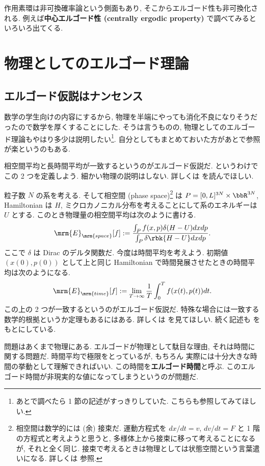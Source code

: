 \documentclass[openany, a4paper, oneside]{jsbook}
\begin{document}
作用素環は非可換確率論という側面もあり, そこからエルゴード性も非可換化される.
例えば\textbf{中心エルゴード性 (centrally ergodic property)} で調べてみるといろいろ出てくる.
\section{物理としてのエルゴード理論}

\subsection{エルゴード仮説はナンセンス}

数学の学生向けの内容にするから,
物理を半端にやっても消化不良になりそうだったので数学を厚くすることにした.
そうは言うものの, 物理としてのエルゴード理論もやはり多少は説明したい\footnote{あとで調べたら \cite{AyumuSugita1} 1 節の記述がすっきりしていた.
こちらも参照してみてほしい.}.
自分としてもまとめておいた方があとで参照が楽というのもある.

相空間平均と長時間平均が一致するというのがエルゴード仮説だ.
というわけでこの 2 つを定義しよう.
細かい物理の説明はしない.
詳しくは \cite{NakamuraYamamoto1, NakamuraYamamoto2} を読んでほしい.

粒子数 $N$ の系を考える.
そして相空間 (phase space)\footnote{相空間は数学的には (余) 接束だ.
運動方程式を $dx / dt = v$, $dv / dt = F$ と 1 階の方程式と考えようと思うと,
多様体上から接束に移って考えることになるが, それと全く同じ.
接束で考えるときは物理としては状態空間という言葉遣いになる.
詳しくは \cite{NakamuraYamamoto1} 参照.} は $P = [0, L]^{3N} \times \bbR^{3N}$,
Hamiltonian は $H$, ミクロカノニカル分布を考えることにして系のエネルギーは $U$ とする.
このとき物理量の相空間平均は次のように書ける.
\begin{align}
 \mrm{E}_{\mrm{space}} [f]
 :=
 \frac{\int_{P} f(x, p) \delta (H - U) dx dp} {\int_{P} \delta \rbk{H - U} dx dp}.
\end{align}
ここで $\delta$ は Dirac のデルタ関数だ.
今度は時間平均を考えよう.
初期値 $(x(0), p(0))$ として上と同じ Hamiltonian で時間発展させたときの時間平均は次のようになる.
\begin{align}
 \mrm{E}_{\mrm{time}} [f]
 :=
 \lim_{T \to \infty} \frac{1}{T} \int_0^T f(x(t), p(t)) dt.
\end{align}
この上の 2 つが一致するというのがエルゴード仮説だ.
特殊な場合には一致する数学的根拠というか定理もあるにはある.
詳しくは \cite{HalTasaki3} を見てほしい.
続く記述も \cite{HalTasaki3} をもとにしている.

問題はあくまで物理にある.
エルゴードが物理として駄目な理由,
それは時間に関する問題だ.
時間平均で極限をとっているが, もちろん
実際には十分大きな時間の挙動として理解できればいい.
この時間を\textbf{エルゴード時間}と呼ぶ.
このエルゴード時間が非現実的な値になってしまうというのが問題だ.
\end{document}
